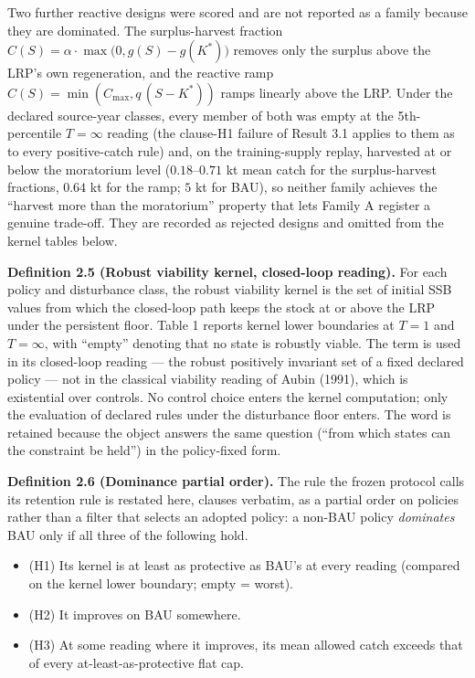 \documentclass[11pt]{article}
\providecommand{\tightlist}{\setlength{\itemsep}{0pt}\setlength{\parskip}{0pt}}
\begin{document}
Two further reactive designs were scored and are not reported as a
family because they are dominated. The surplus-harvest fraction
\(C(S) = \alpha\cdot\max\bigl(0, g(S) - g(K^*)\bigr)\) removes only the
surplus above the LRP's own regeneration, and the reactive ramp
\(C(S) = \min(C_{\max}, q\,(S - K^*))\) ramps linearly above the LRP.
Under the declared source-year classes, every member of both was empty
at the 5th-percentile \(T=\infty\) reading (the clause-H1 failure of
Result 3.1 applies to them as to every positive-catch rule) and, on the
training-supply replay, harvested at or below the moratorium level
(\(0.18\)--\(0.71\) kt mean catch for the surplus-harvest fractions,
\(0.64\) kt for the ramp; \(5\) kt for BAU), so neither family achieves
the ``harvest more than the moratorium'' property that lets Family A
register a genuine trade-off. They are recorded as rejected designs and
omitted from the kernel tables below.

\textbf{Definition 2.5 (Robust viability kernel, closed-loop reading).}
For each policy and disturbance class, the robust viability kernel is
the set of initial SSB values from which the closed-loop path keeps the
stock at or above the LRP under the persistent floor. Table 1 reports
kernel lower boundaries at \(T=1\) and \(T=\infty\), with ``empty''
denoting that no state is robustly viable. The term is used in its
closed-loop reading --- the robust positively invariant set of a fixed
declared policy --- not in the classical viability reading of Aubin
(1991), which is existential over controls. No control choice enters the
kernel computation; only the evaluation of declared rules under the
disturbance floor enters. The word is retained because the object
answers the same question (``from which states can the constraint be
held'') in the policy-fixed form.

\textbf{Definition 2.6 (Dominance partial order).} The rule the frozen
protocol calls its retention rule is restated here, clauses verbatim, as
a partial order on policies rather than a filter that selects an adopted
policy: a non-BAU policy \emph{dominates} BAU only if all three of the
following hold.

\begin{itemize}
\tightlist
\item
  (H1) Its kernel is at least as protective as BAU's at every reading
  (compared on the kernel lower boundary; empty = worst).
\item
  (H2) It improves on BAU somewhere.
\item
  (H3) At some reading where it improves, its mean allowed catch exceeds
  that of every at-least-as-protective flat cap.
\end{itemize}
\end{document}
